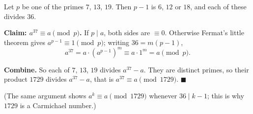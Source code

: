 Let $p$ be one of the primes $7$, $13$, $19$. Then $p-1$ is $6$, $12$ or $18$, and each of these divides $36$.

\textbf{Claim: $a^{37}\equiv a\pmod p$.} If $p\mid a$, both sides are $\equiv0$. Otherwise Fermat's little theorem gives $a^{p-1}\equiv1\pmod p$; writing $36=m(p-1)$,
\[
a^{37}=a\cdot\left(a^{p-1}\right)^m\equiv a\cdot1^m=a\pmod p .
\]

\textbf{Combine.} So each of $7$, $13$, $19$ divides $a^{37}-a$. They are distinct primes, so their product $1729$ divides $a^{37}-a$, that is $a^{37}\equiv a\pmod{1729}$. $\blacksquare$

(The same argument shows $a^{k}\equiv a\pmod{1729}$ whenever $36\mid k-1$; this is why $1729$ is a Carmichael number.)
